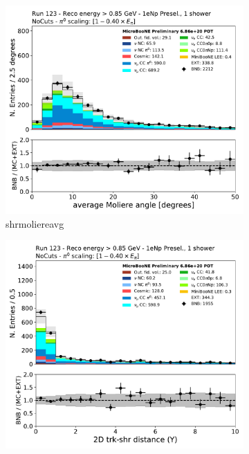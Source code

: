 \begin{figure}[H]
    \centering
    \begin{subfigure}{0.3\textwidth}
    \includegraphics[width=1.0\textwidth]{Sidebands/Figures/1eNp/HighEnergy/HiEext_NPOneShr_None_pi0e040/shrmoliereavg.pdf}
    \caption{shrmoliereavg}
    \end{subfigure}
    \begin{subfigure}{0.3\textwidth}
    \includegraphics[width=1.0\textwidth]{Sidebands/Figures/1eNp/HighEnergy/HiEext_NPOneShr_None_pi0e040/trkshrhitdist2.pdf}

\end{subfigure}
\end{figure}
